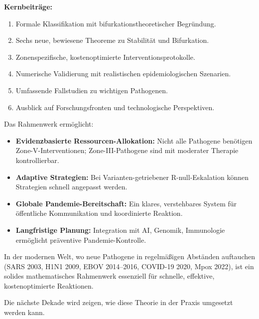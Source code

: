 ﻿\documentclass[a4paper,12pt,twoside]{article}
\theoremstyle{definition}
\begin{document}
\textbf{Kernbeiträge:}

\begin{enumerate}
\item Formale Klassifikation mit bifurkationstheoretischer Begründung.
\item Sechs neue, bewiesene Theoreme zu Stabilität und Bifurkation.
\item Zonenspezifische, kostenoptimierte Interventionsprotokolle.
\item Numerische Validierung mit realistischen epidemiologischen Szenarien.
\item Umfassende Fallstudien zu wichtigen Pathogenen.
\item Ausblick auf Forschungsfronten und technologische Perspektiven.
\end{enumerate}

Das Rahmenwerk ermöglicht:

\begin{itemize}
\item \textbf{Evidenzbasierte Ressourcen-Allokation:} Nicht alle Pathogene benötigen Zone-V-Interventionen; Zone-III-Pathogene sind mit moderater Therapie kontrollierbar.
\item \textbf{Adaptive Strategien:} Bei Varianten-getriebener R-null-Eskalation können Strategien schnell angepasst werden.
\item \textbf{Globale Pandemie-Bereitschaft:} Ein klares, verstehbares System für öffentliche Kommunikation und koordinierte Reaktion.
\item \textbf{Langfristige Planung:} Integration mit AI, Genomik, Immunologie ermöglicht präventive Pandemie-Kontrolle.
\end{itemize}

In der modernen Welt, wo neue Pathogene in regelmäßigen Abständen auftauchen (SARS 2003, H1N1 2009, EBOV 2014--2016, COVID-19 2020, Mpox 2022), ist ein solides mathematisches Rahmenwerk essenziell für schnelle, effektive, kostenoptimierte Reaktionen.

Die nächste Dekade wird zeigen, wie diese Theorie in der Praxis umgesetzt werden kann.

\newpage
\end{document}
